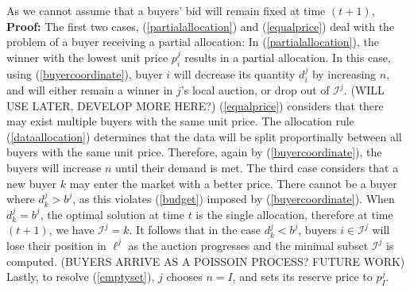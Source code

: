 \documentclass[12pt]{article}
\theoremstyle{definition}
\newcommand{\mcI}{\mathcal{I}}
\begin{document}
\begin{multicols}{2}
{
\label{buyerresponse}
As we cannot
assume that a buyers' bid will remain fixed at time $(t+1)$,
}\\
\textbf{Proof:} 
The first two cases, (\ref{partialallocation}) and (\ref{equalprice}) deal with
the problem of a buyer receiving a partial allocation:
In (\ref{partialallocation}), the winner with the lowest unit price $p_i^j$ results in a partial
allocation. In this case, using (\ref{buyercoordinate}), buyer $i$ will decrease its
quantity $d_i^j$ by increasing $n$, and will either remain a winner in $j$'s local
auction, or drop out of $\mcI^j$. (WILL USE LATER, DEVELOP MORE HERE?)
(\ref{equalprice}) considers that there may exist multiple buyers with the same unit price. The allocation rule (\ref{dataallocation}) determines that the data will be split proportinally
between all buyers with the same unit price. Therefore, again by
(\ref{buyercoordinate}), the buyers will increase $n$ until their demand is
met. 
The third case considers that a new buyer $k$ may enter the market with a better
price. There cannot be a buyer where $d_k^j > b^j$, as this violates
(\ref{budget}) imposed by (\ref{buyercoordinate}). When $d_k^j =
b^j$, the optimal solution at time $t$ is the single allocation, therefore at
time $(t+1)$, we have $\mcI^j = k$. It follows that in the case $d_k^j < b^j$, buyers $i\in\mcI^j$ will
lose their position in $\ell^j$ as the auction progresses and the minimal
subset $\mcI^j$ is computed. 
(BUYERS ARRIVE AS A POISSOIN PROCESS? FUTURE WORK)
Lastly, to resolve (\ref{emptyset}), $j$ chooses $n=I$, and sets its reserve price to $p_I^j$. 



\end{multicols}
\end{document}
